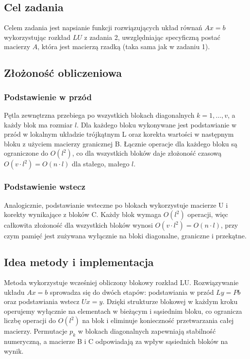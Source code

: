 \documentclass{article}
\begin{document}
\subsection*{Cel zadania}
Celem zadania jest napsianie funkcji rozwiązujących układ równań $Ax = b$ wykorzystując rozkład $LU$ z zadania 2, uwzględniając specyficzną postać macierzy $A$, która jest macierzą rzadką (taka sama jak w zadaniu 1).

\subsection*{Złożoność obliczeniowa}
\subsubsection*{Podstawienie w przód}
Pętla zewnętrzna przebiega po wszystkich blokach diagonalnych $k = 1, \dots, v$, a każdy blok ma rozmiar $l$. 
Dla każdego bloku wykonywane jest podstawianie w przód w lokalnym układzie trójkątnym L oraz korekta wartości w następnym bloku z użyciem macierzy granicznej B. 
Łącznie operacje dla każdego bloku są ograniczone do $O(l^2)$, co dla wszystkich bloków daje złożoność czasową $O(v \cdot l^2) = O(n \cdot l)$ dla stałego, małego $l$.

\subsubsection*{Podstawienie wstecz}
Analogicznie, podstawianie wsteczne po blokach wykorzystuje macierze U i korekty wynikające z bloków C. 
Każdy blok wymaga $O(l^2)$ operacji, więc całkowita złożoność dla wszystkich bloków wynosi $O(v \cdot l^2) = O(n \cdot l)$, przy czym pamięć jest zużywana wyłącznie na bloki diagonalne, graniczne i przekątne.

\subsection*{Idea metody i implementacja}
Metoda wykorzystuje wcześniej obliczony blokowy rozkład LU. 
Rozwiązywanie układu $Ax = b$ sprowadza się do dwóch etapów: podstawiania w przód $Ly = Pb$ oraz podstawiania wstecz $Ux = y$. 
Dzięki strukturze blokowej w każdym kroku operujemy wyłącznie na elementach w bieżącym i sąsiednim bloku, co ogranicza liczbę operacji do $O(l^2)$ na blok i eliminuje konieczność przetwarzania całej macierzy. 
Permutacje $p_k$ w blokach diagonalnych zapewniają stabilność numeryczną, a macierze B i C odpowiadają za wpływ sąsiednich bloków na wynik.
\end{document}
